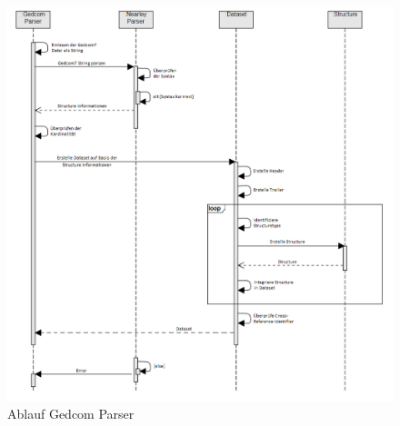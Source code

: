 \begin{figure}[h]
	\centering
	\includegraphics[width=1\textwidth]{images/konzept_sequenz.png}
	\caption{Ablauf Gedcom Parser}
	\label{fig: Sequenz Gedcom Parser}
\end{figure}
\label{sec: Konzept - Gedcom Parser}
